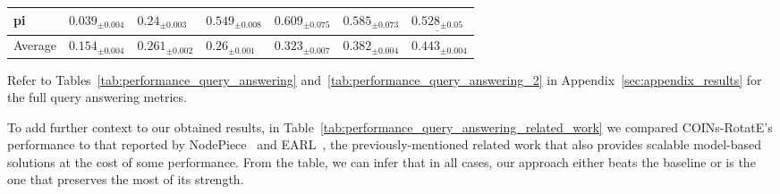 \begin{table}[H]
\begin{adjustbox}{width=\textwidth}
\begin{tabular}{lllllll}
pi    &  ${{0.039}_{\pm 0.004}}$ &   $\mathbf{{0.24}_{\pm 0.003}}$ &  ${{0.549}_{\pm 0.008}}$ &     $\mathbf{{0.609}_{\pm 0.075}}$ &  ${{0.585}_{\pm 0.073}}$ &  $\underline{{0.528}_{\pm 0.05}}$ \\
\midrule
Average &  ${{0.154}_{\pm 0.004}}$ &     $\mathbf{{0.261}_{\pm 0.002}}$ &  ${{0.26}_{\pm 0.001}}$ &  $\mathbf{{0.323}_{\pm 0.007}}$ &  ${{0.382}_{\pm 0.004}}$ &  $\mathbf{{0.443}_{\pm 0.004}}$ \\
\bottomrule
\end{tabular}
\end{adjustbox}
\end{table}

Refer to Tables~\ref{tab:performance_query_answering} and~\ref{tab:performance_query_answering_2} in Appendix~\ref{sec:appendix_results} for the full query answering metrics. 

To add further context to our obtained results, in Table~\ref{tab:performance_query_answering_related_work} we compared COINs-RotatE's performance to that reported by NodePiece~\cite{galkin_nodepiece_2022} and EARL~\cite{chen_entity-agnostic_2023}, the previously-mentioned related work that also provides scalable model-based solutions at the cost of some performance. From the table, we can infer that in all cases, our approach either beats the baseline or is the one that preserves the most of its strength.

